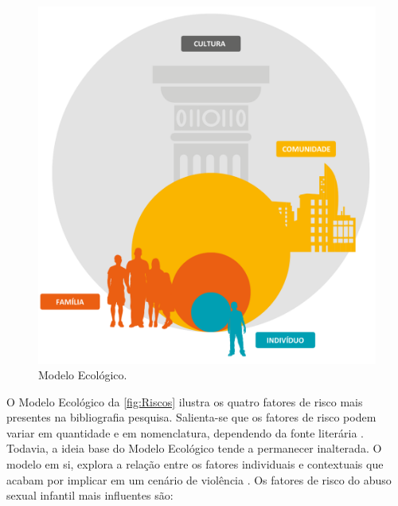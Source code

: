 




\begin{figure}[htb]

	\caption{\label{fig:Riscos}Modelo Ecológico.}
  \begin{center}
    \includegraphics[width=0.75\linewidth]{./Figuras/FatoresRisco.pdf}
	\end{center}

\end{figure}

O Modelo Ecológico da \autoref{fig:Riscos} ilustra os quatro fatores de risco mais presentes na bibliografia pesquisa. Salienta-se que os fatores de risco podem variar em quantidade e em nomenclatura, dependendo da fonte literária \cite{centers2004sexual, sexual2017department, blasco2018abuso, topromising}. Todavia, a ideia base do Modelo Ecológico tende a permanecer inalterada. O modelo em si, explora a relação entre os fatores individuais e contextuais que acabam por implicar em um cenário de violência \cite{dahlberg2006violencia}. Os fatores de risco do abuso sexual infantil mais influentes são:

